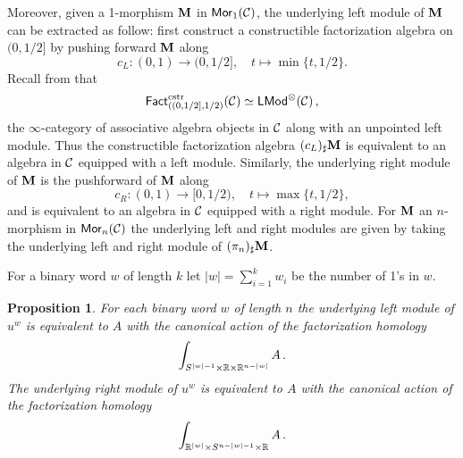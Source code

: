 \documentclass[10pt, reqno, twoside
, final
]{amsart}
\numberwithin{equation}{subsection}%
\theoremstyle{definition}
\theoremstyle{definition}
\theoremstyle{definition}
\theoremstyle{definition}
\theoremstyle{definition}
\theoremstyle{definition}
\theoremstyle{definition}
\theoremstyle{definition}
\theoremstyle{definition}
\theoremstyle{plain}
\theoremstyle{definition}
\theoremstyle{plain}
\theoremstyle{definition}
\theoremstyle{plain}
\theoremstyle{definition}
\theoremstyle{definition}
\theoremstyle{plain}
\theoremstyle{plain}
\theoremstyle{definition}
\theoremstyle{plain}
\theoremstyle{plain}
\newtheorem{prop}[defn]{Proposition}
\theoremstyle{plain}
\begin{document}
Moreover, given a 1-morphism $\mathbf{M}$ in $\mathsf{Mor}_1(\mathcal{C})$, the underlying left module of $\mathbf{M}$ can be extracted as follow: first construct a  constructible factorization algebra on $(0,1/2]$ by pushing forward $\mathbf{M}$ along 
\[c_L : (0,1) \longrightarrow (0,1/2], \quad t \longmapsto \min\{t,1/2\}.\]
Recall from  that 
\begin{equation}\label{eq:module-equiv}
    \mathsf{Fact}^{\mathrm{cstr}}_{((0,1/2],1/2)}(\mathcal{C}) \simeq \mathsf{LMod}^{\otimes}(\mathcal{C}) \,,
\end{equation}
the $\infty$-category of associative algebra objects in $\mathcal{C}$ along with an unpointed left module. Thus the constructible factorization algebra $(c_{L})_{\sharp}\mathbf{M}$ is equivalent to an algebra in $\mathcal{C}$ equipped with a left module. Similarly, the underlying right module of $\mathbf{M}$ is the pushforward of $\mathbf{M}$ along \[c_{R}: (0,1) \longrightarrow [0,1/2), \quad t \longmapsto \max\{t,1/2\},\] and is equivalent to an algebra in $\mathcal{C}$ equipped with a right module.  For $\mathbf{M}$ an $n$-morphism in $\mathsf{Mor}_{n}(\mathcal{C})$ the underlying left and right modules are given by taking the underlying left and right module of $(\pi_{n})_{\sharp}\mathbf{M}$. 


For a binary word $w$ of length $k$ let $|w| = \sum_{i=1}^k w_i$ be the number of 1's in $w$.


\begin{prop}\label{prop:mod-formula}
For each binary word $w$ of length $n$ the underlying left module of $u^w$ is equivalent to $A$ with the canonical action  of the factorization homology
\begin{equation*}
    \int_{S^{|w|-1} \times \mathbb{R} \times \mathbb{R}^{n-|w|}} A \,.
\end{equation*}
The underlying right module of $u^w$ is equivalent to $A$ with the canonical action  of the factorization homology
\begin{equation*}
    \int_{\mathbb{R}^{|w|} \times S^{n - |w| - 1 } \times \mathbb{R}} A \,.
\end{equation*}
\end{prop}
\end{document}

